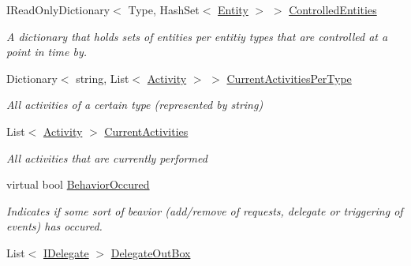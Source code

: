 \begin{DoxyCompactItemize}
\item 
I\+Read\+Only\+Dictionary$<$ Type, Hash\+Set$<$ \hyperlink{class_simulation_core_1_1_h_c_c_m_elements_1_1_entity}{Entity} $>$ $>$ \hyperlink{class_simulation_core_1_1_h_c_c_m_elements_1_1_control_unit_aa3ea3aa1c41fb792989d62da8325698c}{Controlled\+Entities}
\begin{DoxyCompactList}\small\item\em A dictionary that holds sets of entities per entitiy types that are controlled at a point in time by. \end{DoxyCompactList}\item 
Dictionary$<$ string, List$<$ \hyperlink{class_simulation_core_1_1_h_c_c_m_elements_1_1_activity}{Activity} $>$ $>$ \hyperlink{class_simulation_core_1_1_h_c_c_m_elements_1_1_control_unit_ae39305c46818d3c06de97894b410ee91}{Current\+Activities\+Per\+Type}
\begin{DoxyCompactList}\small\item\em All activities of a certain type (represented by string) \end{DoxyCompactList}\item 
List$<$ \hyperlink{class_simulation_core_1_1_h_c_c_m_elements_1_1_activity}{Activity} $>$ \hyperlink{class_simulation_core_1_1_h_c_c_m_elements_1_1_control_unit_a9f4bff56571dc9e479a48bccc9125563}{Current\+Activities}
\begin{DoxyCompactList}\small\item\em All activities that are currently performed \end{DoxyCompactList}\item 
virtual bool \hyperlink{class_simulation_core_1_1_h_c_c_m_elements_1_1_control_unit_aaf47369d9e28b9b669af2d5f93d1cb57}{Behavior\+Occured}
\begin{DoxyCompactList}\small\item\em Indicates if some sort of beavior (add/remove of requests, delegate or triggering of events) has occured. \end{DoxyCompactList}\item 
List$<$ \hyperlink{interface_simulation_core_1_1_h_c_c_m_elements_1_1_i_delegate}{I\+Delegate} $>$ \hyperlink{class_simulation_core_1_1_h_c_c_m_elements_1_1_control_unit_a450ff42f0a252ff4ef8f4b5c6f1e3fd7}{Delegate\+Out\+Box}

\end{DoxyCompactItemize}
